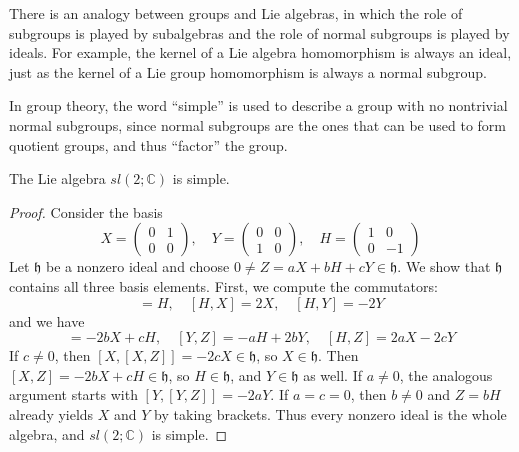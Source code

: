 \documentclass[../main.tex]{subfiles}
\begin{document}
\begin{remark}
  There is an analogy between groups and Lie algebras, in which the role of subgroups is played by subalgebras and the role of normal subgroups is played by ideals. For example, the kernel of a Lie algebra homomorphism is always an ideal, just as the kernel of a Lie group homomorphism is always a normal subgroup.

  In group theory, the word ``simple'' is used to describe a group with no nontrivial normal subgroups, since normal subgroups are the ones that can be used to form quotient groups, and thus ``factor'' the group.
\end{remark}

\begin{proposition}{}{}
  The Lie algebra $sl(2;\mathbb{C})$ is simple.
\end{proposition}
\begin{proof}
  Consider the basis
  \begin{equation*}
    X = \begin{pmatrix}
      0 & 1 \\
      0 & 0
    \end{pmatrix},\quad
    Y = \begin{pmatrix}
      0 & 0 \\
      1 & 0
    \end{pmatrix},\quad
    H = \begin{pmatrix}
      1 & 0 \\
      0 & -1
    \end{pmatrix}
  \end{equation*}
  Let $\mathfrak{h}$ be a nonzero ideal and choose $0\neq Z=aX+bH+cY\in\mathfrak{h}$. We show that $\mathfrak{h}$ contains all three basis elements. First, we compute the commutators:
  \begin{equation*}
    [X, Y] = H,\quad [H, X] = 2X,\quad [H, Y] = -2Y
  \end{equation*}
  and we have
  \begin{equation*}
    [X, Z] = -2bX + cH, \quad [Y, Z] = -aH + 2bY, \quad [H, Z] = 2aX - 2cY
  \end{equation*}
  If $c \neq 0$, then $[X, [X, Z]] = -2cX \in \mathfrak{h}$, so $X \in \mathfrak{h}$. Then $[X, Z] = -2bX + cH \in \mathfrak{h}$, so $H \in \mathfrak{h}$, and $Y \in \mathfrak{h}$ as well. If $a\neq0$, the analogous argument starts with $[Y,[Y,Z]]=-2aY$. If $a=c=0$, then $b\neq0$ and $Z=bH$ already yields $X$ and $Y$ by taking brackets. Thus every nonzero ideal is the whole algebra, and $sl(2;\mathbb{C})$ is simple.
\end{proof}
\end{document}
